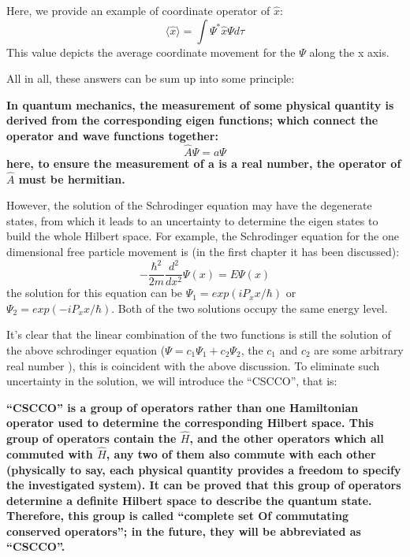 Here, we provide an example of coordinate operator of $\hat{x}$:
\begin{equation}\label{}
\langle\hat{x}\rangle = \int \Psi^{*}\hat{x}\Psi d\tau
\end{equation}
This value depicts the average coordinate movement for the $\Psi$
along the x axis.

All in all, these answers can be sum up into some principle:
\begin{law}
\textbf{In quantum mechanics, the measurement of some physical
quantity is derived from the corresponding eigen functions; which
connect the operator and wave functions together:
\begin{equation}\label{}
\hat{A}\Psi = a\Psi
\end{equation}
here, to ensure the measurement of a is a real number, the operator
of $\hat{A}$ must be hermitian.}
\end{law}

However, the solution of the Schrodinger equation may have the
degenerate states, from which it leads to an uncertainty to
determine the eigen states to build the whole Hilbert space. For
example, the Schrodinger equation for the one dimensional free
particle movement is (in the first chapter it has been discussed):
\begin{equation}\label{}
-\frac{\hbar^{2}}{2m}\frac{d^{2}}{dx^{2}}\Psi(x) = E\Psi(x)
\end{equation}
the solution for this equation can be $\Psi_{1} = exp (
iP_{x}x/\hbar )$ or $\Psi_{2} = exp ( -iP_{x}x/\hbar )$. Both of the
two solutions occupy the same energy level.

It's clear that the linear combination of the two functions is still
the solution of the above schrodinger equation ($\Psi =
c_{1}\Psi_{1} + c_{2}\Psi_{2}$, the $c_{1}$ and $c_{2}$ are some
arbitrary real number ), this is coincident with the above
discussion. To eliminate such uncertainty in the solution, we will
introduce the ``CSCCO'', that is:
\begin{law}
  \textbf{``CSCCO'' is a group of operators rather than one
    Hamiltonian operator used to determine the corresponding Hilbert
    space. This group of operators contain the $\hat{H}$, and the
    other operators which all commuted with $\hat{H}$, any two of them
    also commute with each other (physically to say, each physical
    quantity provides a freedom to specify the investigated
    system). It can be proved that this group of operators determine a
    definite Hilbert space to describe the quantum state. Therefore,
    this group is called ``complete set Of commutating conserved
    operators''; in the future, they will be abbreviated as
    ``CSCCO''.}
\end{law}

